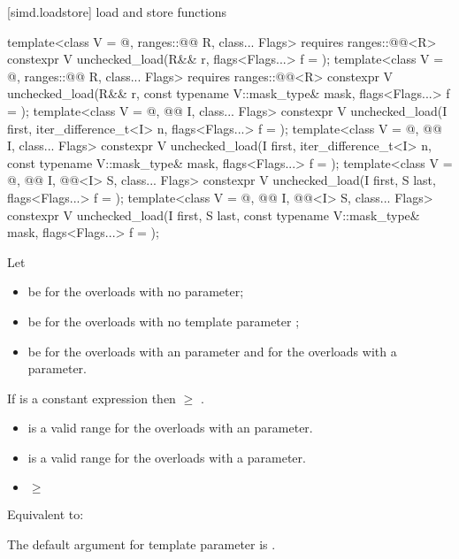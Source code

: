 [simd.loadstore]{ load and store functions}

\begin{itemdecl}
template<class V = @\seebelow@, ranges::@@ R, class... Flags>
  requires ranges::@@<R>
  constexpr V unchecked_load(R&& r, flags<Flags...> f = {});
template<class V = @\seebelow@, ranges::@@ R, class... Flags>
  requires ranges::@@<R>
  constexpr V unchecked_load(R&& r, const typename V::mask_type& mask, flags<Flags...> f = {});
template<class V = @\seebelow@, @@ I, class... Flags>
  constexpr V unchecked_load(I first, iter_difference_t<I> n, flags<Flags...> f = {});
template<class V = @\seebelow@, @@ I, class... Flags>
  constexpr V unchecked_load(I first, iter_difference_t<I> n, const typename V::mask_type& mask,
                             flags<Flags...> f = {});
template<class V = @\seebelow@, @@ I, @@<I> S, class... Flags>
  constexpr V unchecked_load(I first, S last, flags<Flags...> f = {});
template<class V = @\seebelow@, @@ I, @@<I> S, class... Flags>
  constexpr V unchecked_load(I first, S last, const typename V::mask_type& mask,
                             flags<Flags...> f = {});
\end{itemdecl}

\begin{itemdescr}
\pnum
Let
\begin{itemize}
 \item
    be  for the overloads with no
    parameter;
 \item
    be  for the overloads with no
   template parameter ;
 \item
    be  for the overloads with an 
   parameter and  for the overloads with a 
   parameter.
\end{itemize}

\pnum
\mandates
If  is a constant expression then
 $\ge$ .

\pnum
\expects
\begin{itemize}
\item {} is a valid range for the overloads with an
   parameter.
\item {} is a valid range for the overloads with a
   parameter.
\item {} $\ge$ 
\end{itemize}

\pnum
\effects
Equivalent to: 

\pnum
\remarks
The default argument for template parameter  is
.
\end{itemdescr}

